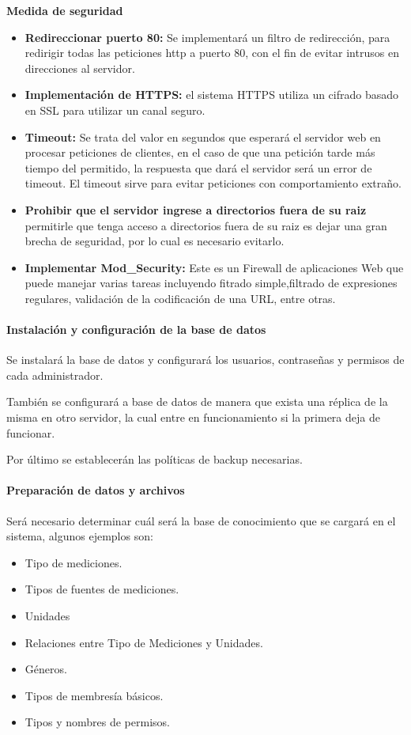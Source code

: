 \textbf{Medida de seguridad}
\begin{itemize}
	\item \textbf{Redireccionar puerto 80: } Se implementará un filtro de redirección, para redirigir todas las peticiones http a puerto 80, con el fin de evitar intrusos en direcciones al servidor.
	\item \textbf{Implementación de HTTPS: } el sistema HTTPS utiliza un cifrado basado en SSL para utilizar un canal seguro.
	\item \textbf{Timeout: }Se trata del valor en segundos que esperará el servidor web en procesar peticiones de clientes, en el caso de que una petición tarde más tiempo del permitido, la respuesta que dará el servidor será un error de timeout. El timeout sirve para evitar peticiones con comportamiento extraño.
	\item \textbf{Prohibir que el servidor ingrese a directorios fuera de su raiz} permitirle que tenga acceso a directorios fuera de su raiz es dejar una gran brecha de seguridad, por lo cual es necesario evitarlo.
	\item \textbf{Implementar Mod\_Security:} Este es un Firewall de aplicaciones Web que puede manejar varias tareas incluyendo fitrado simple,filtrado de expresiones regulares, validación de la codificación de una URL, entre otras.
\end{itemize}

\paragraph{Instalación y configuración de la base de datos}
	Se instalará la base de datos y configurará los usuarios, contraseñas y permisos de cada administrador.
	
	También se configurará a base de datos de manera que exista una réplica de la  misma en otro servidor, la cual entre en funcionamiento si la primera deja de funcionar.
	
	Por último se establecerán las políticas de backup necesarias.


	\paragraph{Preparación de datos y archivos}
	Será necesario determinar cuál será la base de conocimiento que se cargará en el sistema, algunos ejemplos son:
    \begin{itemize}
        \item Tipo de mediciones.
        \item Tipos de fuentes de mediciones.
        \item Unidades
        \item Relaciones entre Tipo de Mediciones y Unidades.
        \item Géneros.
        \item Tipos de membresía básicos.
        \item Tipos y nombres de permisos.
	\end{itemize} 
    
